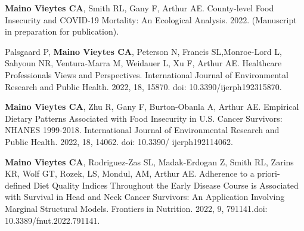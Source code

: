 




\begin{cvskills}

  \cvskill
    {} %
    {\textbf{Maino Vieytes CA}, Smith RL, Gany F, Arthur AE. County-level Food Insecurity and COVID-19 Mortality: An Ecological Analysis. 2022. (Manuscript in preparation for publication).} %


  
   \cvskill
    {} %
    {Palsgaard P, \textbf{Maino Vieytes CA}, Peterson N, Francis SL,Monroe-Lord L, Sahyoun NR, Ventura-Marra M, Weidauer L, Xu F, Arthur AE. Healthcare Professionals Views and Perspectives. International Journal of Environmental Research and Public Health. 2022, 18, 15870. doi: 10.3390/ijerph192315870.} %



 \cvskill
    {} %
    {\textbf{Maino Vieytes CA}, Zhu R, Gany F, Burton-Obanla A, Arthur AE. Empirical Dietary Patterns Associated with Food Insecurity in U.S. Cancer Survivors: NHANES 1999-2018. International Journal of Environmental Research and Public Health. 2022, 18, 14062. doi: 10.3390/ ijerph192114062.} %



  \cvskill
    {} %
    {\textbf{Maino Vieytes CA}, Rodriguez-Zas SL, Madak-Erdogan Z, Smith RL, Zarins KR, Wolf GT, Rozek, LS, Mondul, AM, Arthur AE. Adherence to a priori-defined Diet Quality Indices Throughout the Early Disease Course is Associated with Survival in Head and Neck Cancer Survivors: An Application Involving Marginal Structural Models. Frontiers in Nutrition. 2022, 9, 791141.doi: 10.3389/fnut.2022.791141.} %



\end{cvskills}
